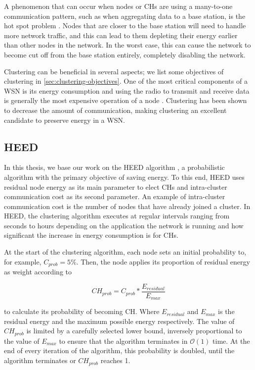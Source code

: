 A phenomenon that can occur when nodes or CHs are using a many-to-one communication pattern, such as when aggregating data to a base station, is the hot spot problem \cite{Perillo2005-hot-spot-survey}. Nodes that are closer to the base station will need to handle more network traffic, and this can lead to them depleting their energy earlier than other nodes in the network. In the worst case, this can cause the network to become cut off from the base station entirely, completely disabling the network.

Clustering can be beneficial in several aspects; we list some objectives of clustering in \cref{sec:clustering-objectives}. One of the most critical components of a WSN is its energy consumption and using the radio to transmit and receive data is generally the most expensive operation of a node \cite{Anastasi2009-wsn-energy-consumption}. Clustering has been shown to decrease the amount of communication, making clustering an excellent candidate to preserve energy in a WSN.


\subsection{HEED}
\label{subsection:background-heed}
In this thesis, we base our work on the HEED algorithm \cite{Younis2004-HEED}, a probabilistic algorithm with the primary objective of saving energy. To this end, HEED uses residual node energy as its main parameter to elect CHs and intra-cluster communication cost as its second parameter. An example of intra-cluster communication cost is the number of nodes that have already joined a cluster. In HEED, the clustering algorithm executes at regular intervals ranging from seconds to hours depending on the application the network is running and how significant the increase in energy consumption is for CHs.

At the start of the clustering algorithm, each node sets an initial probability to, for example, $C_{prob} = 5\%$. Then, the node applies its proportion of residual energy as weight according to

\begin{equation*}
CH_{prob} = C_{prob} * \frac{E_{residual}}{E_{max}}
\end{equation*}

to calculate its probability of becoming CH. Where $E_{residual}$ and $E_{max}$ is the residual energy and the maximum possible energy respectively. The value of $CH_{prob}$ is limited by a carefully selected lower bound, inversely proportional to the value of $E_{max}$ to ensure that the algorithm terminates in $\mathcal{O}(1)$ time. At the end of every iteration of the algorithm, this probability is doubled, until the algorithm terminates or $CH_{prob}$ reaches 1. 

